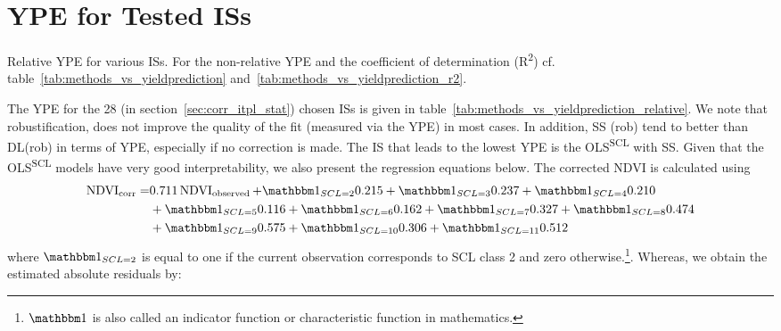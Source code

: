 \section{YPE for Tested ISs} \label{sec:results_ndvi_corr}
	\begin{table}
		\begin{center}
			\caption[Relative Yield Estimation Error for ISs]{Relative YPE for various ISs. For the non-relative YPE and the coefficient of determination (R\textsuperscript{2}) cf. table~\ref{tab:methods_vs_yieldprediction} and~\ref{tab:methods_vs_yieldprediction_r2}.}
			\small
			
			\label{tab:methods_vs_yieldprediction_relative}
			\normalsize
		\end{center}
	\end{table}
	The YPE for the 28 (in section~\ref{sec:corr_itpl_stat}) chosen {{IS}}s is given in table~\ref{tab:methods_vs_yieldprediction_relative}. We note that robustification, does not improve the quality of the fit (measured via the YPE) in most cases. 
	In addition, SS (rob) tend to better than DL(rob) in terms of YPE, especially if no correction is made. The {{IS}} that leads to the lowest YPE is the OLS\textsuperscript{SCL} with SS. Given that the OLS\textsuperscript{SCL} models have very good interpretability, we also present the regression equations below. The corrected NDVI is calculated using 
	\begin{equation}\label{eq:corr_lm}
		\begin{aligned}		
			{\operatorname{NDVI}}_{\text{corr}}  = &
			0.711 \operatorname{NDVI}_\text{observed}  
			+ \mathbbm 1_{{SCL = 2}} 0.215 
			+ \mathbbm 1_{{SCL = 3}} 0.237 
			+ \mathbbm 1_{{SCL = 4}} 0.210 \\ &
			+ \mathbbm 1_{{SCL = 5}} 0.116 
			+ \mathbbm 1_{{SCL = 6}} 0.162 
			+ \mathbbm 1_{{SCL = 7}} 0.327 
			+ \mathbbm 1_{{SCL = 8}} 0.474 \\ &
			+ \mathbbm 1_{{SCL = 9}} 0.575 
			+ \mathbbm 1_{{SCL = 10}} 0.306 
			+ \mathbbm 1_{{SCL = 11}} 0.512 
		\end{aligned}
	\end{equation} 
	where $\mathbbm 1_{{SCL = 2}}$ is equal to one if the current observation corresponds to SCL class 2 and zero otherwise.\footnote{$\mathbbm 1$ is also called an indicator function or characteristic function in mathematics.}. Whereas, we obtain the estimated absolute residuals by: 
